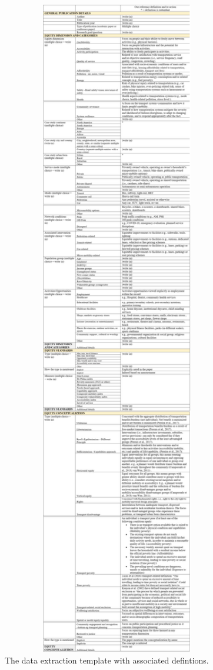 \documentclass[12pt, oneside]{report}
\begin{document}
\begin{figure}

{\centering \includegraphics[width=3.97in,height=\textheight]{figures/Data-extract-template.png}

}

\caption{\label{fig-A2}The data extraction template with associated
defintions.}

\end{figure}
\end{document}
